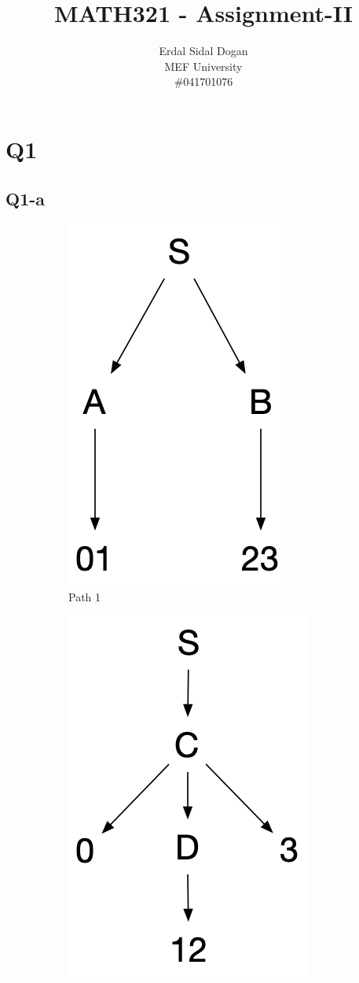 \documentclass{article}
\author{Erdal Sidal Dogan \\ MEF University\\ \#041701076}
\title{MATH321 - Assignment-II}
\begin{document}
	\maketitle
	\section{Q1}
 \subsection{Q1-a}
\begin{figure}[h]
	\captionsetup[subfigure]{justification=centering}
	\begin{subfigure}[h]{0.5\textwidth}
		\hspace{2.85cm}
		\includegraphics[scale=0.3]{Q1_a} 
		\caption{Path 1}
		\label{fig:subim1}
	\end{subfigure}
	\begin{subfigure}[h]{0.5\textwidth}
		\hspace{2.85cm}
		\includegraphics[scale=0.3]{Q1_b}

\end{subfigure}
\end{figure}
\end{document}
